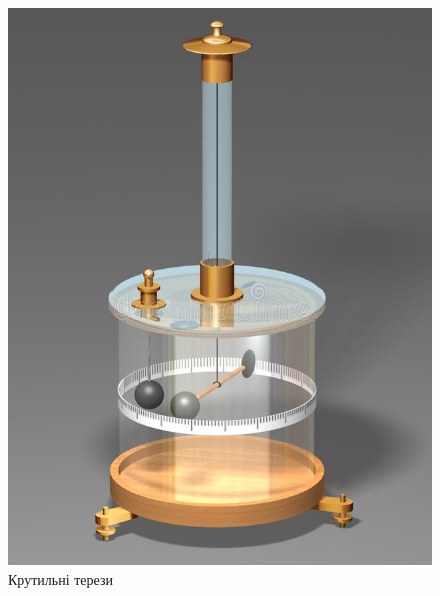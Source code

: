 \documentclass{LabWork}
\begin{document}
\begin{figure}[ht!]\centering
	\begin{minipage}[t]{0.45\linewidth}\centering
			\includegraphics[width=0.99\linewidth]{ColumbTorsiomBalance}
			\caption{Крутильні терези}
			\label{pic:ColumbTorsiomBalance}
	\end{minipage}
	\quad%
	\begin{minipage}[t]{0.45\linewidth}\centering

\end{minipage}
\end{figure}
\end{document}
